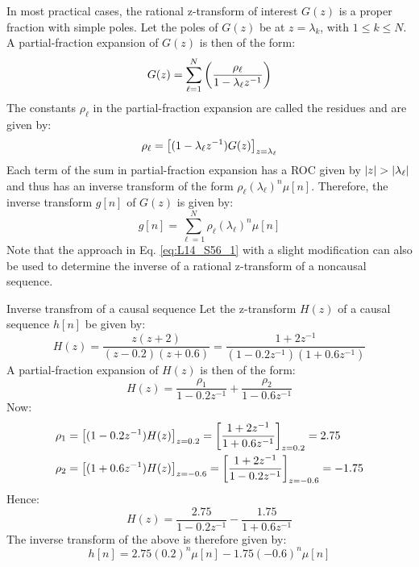 \documentclass[../../main/main.tex]{subfiles}
\begin{document}
In most practical cases, the rational z-transform of interest \( G(z) \) is a proper fraction with simple poles. Let the poles of \( G(z) \) be at \( z = \lambda_{k} \), with \( 1 \le k \le N \). A partial-fraction expansion of \( G(z) \) is then of the form:
\begin{equation}
    G(z)
    =
    \sum_{\ell=1}^{N} \qty(\frac{\rho_{\ell}}{1 - \lambda_{\ell}z^{-1}})
    \label{eq:L14_S54_1}
\end{equation}
The constants \( \rho_{\ell} \) in the partial-fraction expansion are called the residues and are given by:
\begin{equation}
    \rho_{\ell}
    =
    \qty[(1 - \lambda_{\ell}z^{-1}) G(z)]_{z=\lambda_{\ell}}
    \label{eq:L14_S55_1}
\end{equation}
Each term of the sum in partial-fraction expansion has a ROC given by \( \abs{z} > \abs{\lambda_{\ell}} \) and thus has an inverse transform of the form \( \rho_{\ell}(\lambda_{\ell})^{n} \mu[n] \).
Therefore, the inverse transform \( g[n] \) of \( G(z) \) is given by:
\begin{equation}
    g[n]
    =
    \sum_{\ell=1}^{N} \rho_{\ell} (\lambda_{\ell})^{n} \mu[n]
    \label{eq:L14_S56_1}
\end{equation}
Note that the approach in Eq. \ref{eq:L14_S56_1} with a slight modification can also be used to determine the inverse of a rational z-transform of a noncausal sequence.

\begin{example}{Inverse transfrom of a causal sequence}{}
    Let the z-transform \( H(z) \) of a causal sequence \( h[n] \) be given by:
    \begin{equation}
        H(z)
        =
        \frac{z(z+2)}{(z-0.2)(z+0.6)}
        =
        \frac{1 + 2z^{-1}}{(1-0.2z^{-1})(1 + 0.6z^{-1})}
        \label{eq:L14_S57_1}
    \end{equation}
    A partial-fraction expansion of \( H(z) \) is then of the form:
    \begin{equation}
        H(z)
        =
        \frac{\rho_{1}}{1 - 0.2z^{-1}} + \frac{\rho_{2}}{1 - 0.6z^{-1}}
        \label{eq:L14_S57_2}
    \end{equation}
    Now:
    \begin{align}
        \rho_{1} &= \qty[(1-0.2z^{-1})H(z)]_{z=0.2} = \qty[\frac{1+2z^{-1}}{1+0.6z^{-1}}]_{z=0.2} = 2.75    \\
        \rho_{2} &= \qty[(1+0.6z^{-1})H(z)]_{z=-0.6} = \qty[\frac{1+2z^{-1}}{1-0.2z^{-1}}]_{z=-0.6} = -1.75
    \end{align}
    Hence:
    \begin{equation}
        H(z)
        =
        \frac{2.75}{1 - 0.2z^{-1}} - \frac{1.75}{1 + 0.6z^{-1}}
        \label{eq:L14_S59_1}
    \end{equation}
    The inverse transform of the above is therefore given by:
    \begin{equation}
        h[n]
        =
        2.75(0.2)^{n} \mu[n] - 1.75(-0.6)^{n} \mu[n]
        \label{eq:L14_S59_2}
    \end{equation}
\end{example}
\end{document}
